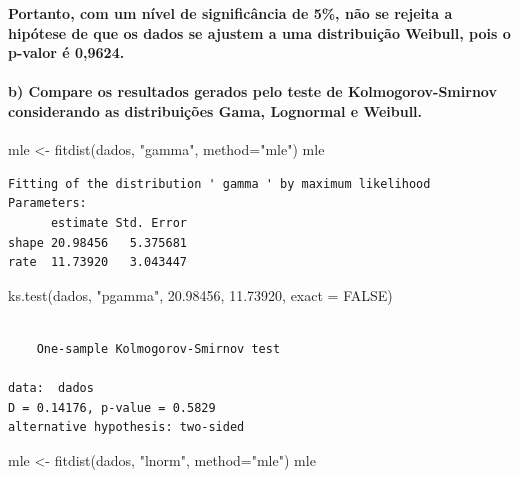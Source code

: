 \documentclass[
  letterpaper,
  DIV=11,
  numbers=noendperiod]{scrartcl}
\let\oldparagraph\paragraph
\renewcommand{\paragraph}[1]{\oldparagraph{#1}\mbox{}}
\newenvironment{Shaded}{\begin{snugshade}}{\end{snugshade}}
\newcommand{\AttributeTok}[1]{\textcolor[rgb]{0.40,0.45,0.13}{#1}}
\newcommand{\ConstantTok}[1]{\textcolor[rgb]{0.56,0.35,0.01}{#1}}
\newcommand{\FloatTok}[1]{\textcolor[rgb]{0.68,0.00,0.00}{#1}}
\newcommand{\FunctionTok}[1]{\textcolor[rgb]{0.28,0.35,0.67}{#1}}
\newcommand{\NormalTok}[1]{\textcolor[rgb]{0.00,0.23,0.31}{#1}}
\newcommand{\OtherTok}[1]{\textcolor[rgb]{0.00,0.23,0.31}{#1}}
\newcommand{\StringTok}[1]{\textcolor[rgb]{0.13,0.47,0.30}{#1}}
\begin{document}
\textbf{Portanto, com um nível de significância de 5\%, não se rejeita a
hipótese de que os dados se ajustem a uma distribuição Weibull, pois o
p-valor é 0,9624.}

\hypertarget{b-compare-os-resultados-gerados-pelo-teste-de-kolmogorov-smirnov-considerando-as-distribuiuxe7uxf5es-gama-lognormal-e-weibull.}{%
\paragraph{b) Compare os resultados gerados pelo teste de
Kolmogorov-Smirnov considerando as distribuições Gama, Lognormal e
Weibull.}\label{b-compare-os-resultados-gerados-pelo-teste-de-kolmogorov-smirnov-considerando-as-distribuiuxe7uxf5es-gama-lognormal-e-weibull.}}

\begin{Shaded}
\begin{Highlighting}[]
\NormalTok{mle }\OtherTok{\textless{}{-}} \FunctionTok{fitdist}\NormalTok{(dados, }\StringTok{"gamma"}\NormalTok{, }\AttributeTok{method=}\StringTok{"mle"}\NormalTok{)}
\NormalTok{mle}
\end{Highlighting}
\end{Shaded}

\begin{verbatim}
Fitting of the distribution ' gamma ' by maximum likelihood 
Parameters:
      estimate Std. Error
shape 20.98456   5.375681
rate  11.73920   3.043447
\end{verbatim}

\begin{Shaded}
\begin{Highlighting}[]
\FunctionTok{ks.test}\NormalTok{(dados, }\StringTok{"pgamma"}\NormalTok{, }\FloatTok{20.98456}\NormalTok{, }\FloatTok{11.73920}\NormalTok{, }\AttributeTok{exact =} \ConstantTok{FALSE}\NormalTok{)}
\end{Highlighting}
\end{Shaded}

\begin{verbatim}

    One-sample Kolmogorov-Smirnov test

data:  dados
D = 0.14176, p-value = 0.5829
alternative hypothesis: two-sided
\end{verbatim}

\begin{Shaded}
\begin{Highlighting}[]
\NormalTok{mle }\OtherTok{\textless{}{-}} \FunctionTok{fitdist}\NormalTok{(dados, }\StringTok{"lnorm"}\NormalTok{, }\AttributeTok{method=}\StringTok{"mle"}\NormalTok{)}
\NormalTok{mle}
\end{Highlighting}
\end{Shaded}
\end{document}
